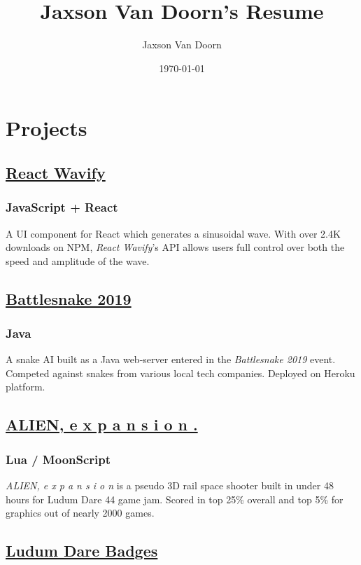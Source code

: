 \documentclass[letterpaper]{article}
\author{Jaxson Van Doorn}
\date{\today}
\title{Jaxson Van Doorn's Resume}
\begin{document}
 
\section{Projects}
\label{sec:orgd4d2a2d}
\subsection{\href{https://github.com/woofers/react-wavify}{React Wavify}}
\label{sec:org3878d39}
\subsubsection{JavaScript + React}
\label{sec:orgaf8d948}
A UI component for React which generates a sinusoidal wave.  With over 2.4K downloads on NPM, \emph{React Wavify}'s API allows users full control over both the speed and amplitude of the wave.
\subsection{\href{https://github.com/woofers/battlesnake-2019}{Battlesnake 2019}}
\label{sec:org9a463c6}
\subsubsection{Java}
\label{sec:org72caada}
A snake AI built as a Java web-server entered in the \emph{Battlesnake 2019} event.  Competed against snakes from various local tech companies.  Deployed on Heroku platform.

\subsection{\href{https://github.com/woofers/ludum-dare-44}{ALIEN, e x p a n s i o n .}}
\label{sec:orgcd1f701}
\subsubsection{Lua / MoonScript}
\label{sec:org1c4ec4e}
\emph{ALIEN, e x p a n s i o n} is a pseudo 3D rail space shooter built in under 48 hours for Ludum Dare 44 game jam.  Scored in top 25\% overall and top 5\% for graphics out of nearly 2000 games.

\subsection{\href{https://github.com/woofers/ludum-dare-badges}{Ludum Dare Badges}}
\label{sec:org54762f2}
\end{document}
